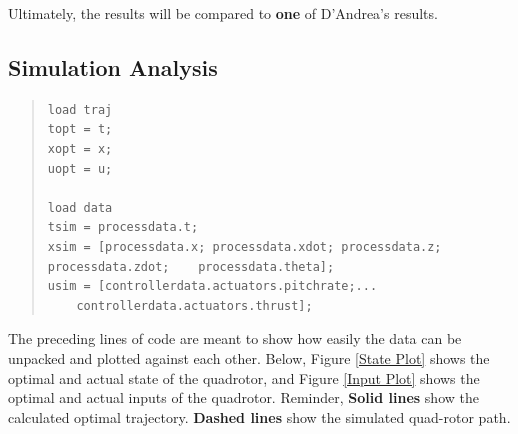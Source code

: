 \documentclass[12pt]{article}
\begin{document}
Ultimately, the results will be compared to \textbf{one} of D'Andrea's results\cite{D'Andrea}. 

\subsection{Simulation Analysis}
\begin{quote}
\begin{lstlisting}
load traj
topt = t;
xopt = x;
uopt = u;

load data
tsim = processdata.t;
xsim = [processdata.x; processdata.xdot; processdata.z; processdata.zdot;    processdata.theta];
usim = [controllerdata.actuators.pitchrate;...
	controllerdata.actuators.thrust];
\end{lstlisting}
\end{quote}
The preceding lines of code are meant to show how easily the data can be unpacked and plotted against each other. Below, Figure \ref{State Plot} shows the optimal and actual state of the quadrotor, and Figure \ref{Input Plot} shows the optimal and actual inputs of the quadrotor.
\newline
\newline
Reminder, \textbf{Solid lines} show the calculated optimal trajectory. \textbf{Dashed lines} show the simulated quad-rotor path.
\end{document}
